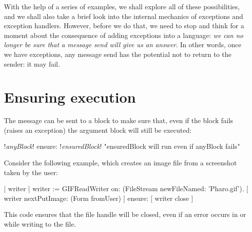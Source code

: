 \documentclass[a4paper,10pt,twoside]{book}
\begin{document}
With the help of a series of examples, we shall explore all of these possibilities, and we shall also take a brief look into the internal mechanics of exceptions and exception handlers.
However, before we do that, we need to stop and think for a moment about the consequence of adding exceptions into a language: \emph{we can no longer be sure that a message send will give us an answer}.  
In other words, once we have exceptions, any message send has the potential not to return to the sender: it may fail. 

\section{Ensuring execution}

The  message can be sent to a block to make sure that, even if the block fails (\eg raises an exception) the argument block will still be executed:
\begin{code}{}
!\emph{anyBlock}! ensure: !\emph{ensuredBlock}!    "ensuredBlock will run even if anyBlock fails"
\end{code}

Consider the following example, which creates an image file from a screenshot taken by the user:



\begin{code}{}
| writer |
writer := GIFReadWriter on: (FileStream newFileNamed: 'Pharo.gif').
[ writer nextPutImage: (Form fromUser) ]
	ensure: [ writer close ]
\end{code}


\noindent
This code ensures that the  file handle will be closed, even if an error occurs in  or while writing to the file.
\end{document}
